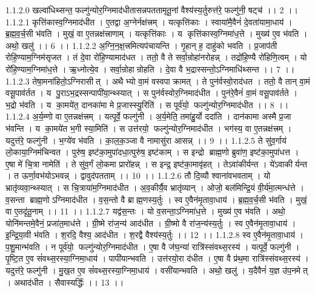 1.1.2.0
खल्वा॑धिथ्सन्त॒ फल्गु॑न्योर॒ग्निमाद॑धीतासन्नपततामृतू॒नां वैश्य॑स्य॒र्तुरुत्त॑रे॒ फल्गु॑नी॒ षट्च॑ ।। 2 ।।
1.1.2.1
कृत्ति॑कास्व॒ग्निमाद॑धीत । ए॒तद्वा अ॒ग्नेर्नक्ष॑त्त्रम् । यत्कृत्ति॑काः । स्वाया॑मै॒वैनं॑ दे॒वता॑यामा॒धाय॑ । ब्र॒ह्म॒व॒र्च॒सी भ॑वति । मुखं॒ वा ए॒तन्नक्ष॑त्त्राणाम् । यत्कृत्ति॑काः । य कृत्ति॑कास्व॒ग्निमा॑ध॒त्ते । मुख्य॑ ए॒व भ॑वति । अथो॒ खलु॑ ।। 6 ।।
1.1.2.2
अ॒ग्नि॒न॒क्ष॒त्त्रमित्यप॑चायन्ति । गृ॒हान् ह॒ दाहु॑को भवति । प्र॒जाप॑ती रोहि॒ण्याम॒ग्निम॑सृजत । तं दे॒वा रो॑हि॒ण्यामाद॑धत । ततो॒ वै ते सर्वा॒न्रोहा॑नरोहन्न् । तद्रो॑हि॒ण्यै रो॑हिणि॒त्वम् । यो रो॑हि॒ण्याम॒ग्निमा॑ध॒त्ते । ऋ॒ध्नोत्ये॒व । सर्वा॒न्रोहान्रोहति । दे॒वा वै भ॒द्रास्सन्तो॒ऽग्निमाधि॑थ्सन्त ।। 7 ।।
1.1.2.3
तेषा॒मना॑हितो॒ऽग्निरासीत् । अथैभ्यो वा॒मं वस्वपाक्रामत् । ते पुन॑र्वस्वो॒राद॑धत । ततो॒ वै तान् वा॒मं वसू॒पाव॑र्तत । य पु॒राऽभ॒द्रस्सन्पापी॑या॒न्थ्स्यात् । स पुन॑र्वस्वोर॒ग्निमाद॑धीत । पुन॑रे॒वैनं॑ वा॒मं वसू॒पाव॑र्तते । भ॒द्रो भ॑वति । य का॒मये॑त॒ दानका॑मा मे प्र॒जास्स्यु॒रिति॑ । स पूर्व॑यो॒ फल्गु॑न्योर॒ग्निमाद॑धीत ।। 8 ।।
1.1.2.4
अ॒र्य॒म्णो वा ए॒तन्नक्ष॑त्त्रम् । यत्पूर्वे॒ फल्गु॑नी । अ॒र्य॒मेति॒ तमा॑हु॒र्यो ददा॑ति । दान॑कामा अस्मै प्र॒जा भ॑वन्ति । य का॒मये॑त भ॒गी स्या॒मिति॑ । स उत्त॑रयो॒ फल्गु॑न्योर॒ग्निमाद॑धीत । भग॑स्य॒ वा ए॒तन्नक्ष॑त्त्रम् । यदुत्त॑रे॒ फल्गु॑नी । भ॒ग्ये॑व भ॑वति । का॒ल॒क॒ञ्जा वै नामासु॑रा आसन्न् ।। 9 ।।
1.1.2.5
ते सु॑व॒र्गाय॑ लो॒काया॒ग्निम॑चिन्वत । पुरु॑ष॒ इष्ट॑का॒मुपा॑दधा॒त्पुरु॑ष॒ इष्ट॑काम् । स इन्द्रो ब्राह्म॒णो ब्रुवा॑ण॒ इष्ट॑का॒मुपा॑धत्त । ए॒षा मे॑ चि॒त्रा नामेति॑ । ते सु॑व॒र्गं लो॒कमा प्रारो॑हन्न् । स इन्द्र॒ इष्ट॑का॒मावृ॑हत् । तेऽवा॑कीर्यन्त । ये॑ऽवाकीर्यन्त । त ऊर्णा॒वभ॑योऽभवन्न् । द्वावुद॑पतताम् ।। 10 ।।
1.1.2.6
तौ दि॒व्यौ श्वाना॑वभवताम् । यो भ्रातृ॑व्यवा॒न्थ्स्यात् । स चि॒त्राया॑म॒ग्निमाद॑धीत । अ॒व॒कीर्यै॒व भ्रातृ॑व्यान् । ओजो॒ बल॑मिन्द्रि॒यं वी॒र्य॑मा॒त्मन्ध॑त्ते । व॒सन्ता ब्राह्म॒णोऽग्निमाद॑धीत । व॒स॒न्तो वै ब्राह्म॒णस्य॒र्तुः । स्व ए॒वैन॑मृ॒तावा॒धाय॑ । ब्र॒ह्म॒व॒र्च॒सी भ॑वति । मुखं॒ वा ए॒तदृ॑तू॒नाम् ।। 11 ।।
1.1.2.7
यद्व॑स॒न्तः । यो व॒सन्ता॒ऽग्निमा॑ध॒त्ते । मुख्य॑ ए॒व भ॑वति । अथो॒ योनि॑मन्तमे॒वैनं॒ प्रजा॑त॒माध॑त्ते । ग्री॒ष्मे रा॑ज॒न्य॑ आद॑धीत । ग्री॒ष्मो वै रा॑ज॒न्य॑स्य॒र्तुः । स्व ए॒वैन॑मृ॒तावा॒धाय॑ । इ॒न्द्रि॒या॒वी भ॑वति । श॒रदि॒ वैश्य॒ आद॑धीत । श॒रद्वै वैश्य॑स्य॒र्तुः ।। 12 ।।
1.1.2.8
स्व ए॒वैन॑मृ॒तावा॒धाय॑ । प॒शु॒मान्भ॑वति । न पूर्व॑यो॒ फल्गु॑न्योर॒ग्निमाद॑धीत । ए॒षा वै ज॑घ॒न्या॑ रात्रि॑स्संवथ्स॒रस्य॑ । यत्पूर्वे॒ फल्गु॑नी । पृ॒ष्टि॒त ए॒व सं॑वथ्स॒रस्या॒ग्निमा॒धाय॑ । पापी॑यान्भवति । उत्त॑रयो॒रा द॑धीत । ए॒षा वै प्र॑थ॒मा रात्रि॑स्संवथ्स॒रस्य॑ । यदुत्त॑रे॒ फल्गु॑नी । मु॒ख॒त ए॒व सं॑वथ्स॒रस्या॒ग्निमा॒धाय॑ । वसी॑यान्भवति । अथो॒ खलु॑ । य॒दैवैनं॑ य॒ज्ञ उ॑प॒नमेत् । अथाद॑धीत । सैवास्यर्द्धिः॑ ।। 13 ।।
